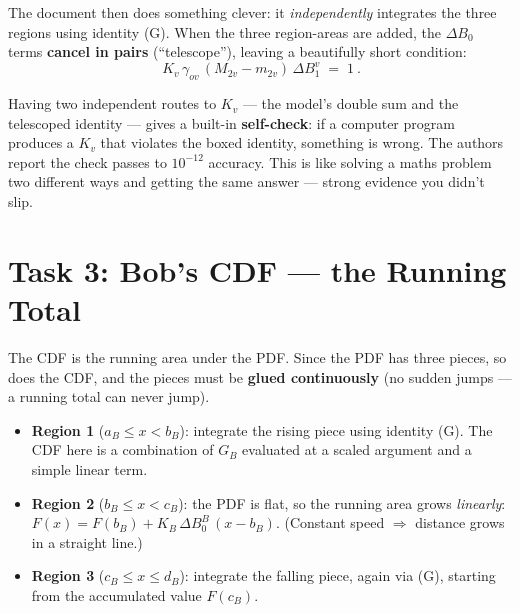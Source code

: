 \documentclass[11pt]{article}
\begin{document}
The document then does something clever: it \emph{independently} integrates the three
regions using identity (G). When the three region-areas are added, the $\Delta B_0$
terms \textbf{cancel in pairs} (``telescope''), leaving a beautifully short condition:
\[
\boxed{\ K_v\,\gamma_{ov}\,(M_{2v}-m_{2v})\,\Delta B_1^{v} \;=\; 1\ }.
\]

\begin{ideabox}
Having two independent routes to $K_v$ --- the model's double sum and the telescoped
identity --- gives a built-in \textbf{self-check}: if a computer program produces a
$K_v$ that violates the boxed identity, something is wrong. The authors report the
check passes to $10^{-12}$ accuracy. This is like solving a maths problem two
different ways and getting the same answer --- strong evidence you didn't slip.
\end{ideabox}

\section{Task 3: Bob's CDF --- the Running Total}

The CDF is the running area under the PDF. Since the PDF has three pieces, so does the
CDF, and the pieces must be \textbf{glued continuously} (no sudden jumps --- a running
total can never jump).

\begin{itemize}
\item \textbf{Region 1} ($a_B\le x<b_B$): integrate the rising piece using identity
      (G). The CDF here is a combination of $G_B$ evaluated at a scaled argument and a
      simple linear term.
\item \textbf{Region 2} ($b_B\le x<c_B$): the PDF is flat, so the running area grows
      \emph{linearly}: $F(x) = F(b_B) + K_B\,\Delta B_0^{B}\,(x-b_B)$. (Constant
      speed $\Rightarrow$ distance grows in a straight line.)
\item \textbf{Region 3} ($c_B\le x\le d_B$): integrate the falling piece, again via
      (G), starting from the accumulated value $F(c_B)$.
\end{itemize}
\end{document}
